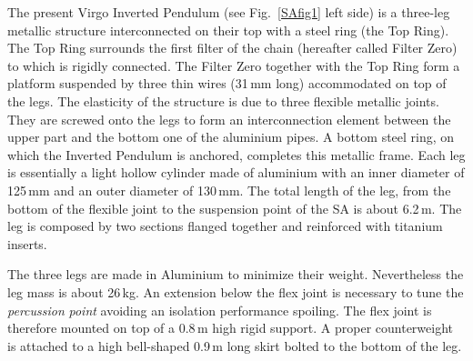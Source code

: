 The present Virgo Inverted Pendulum (see Fig.~\ref{SAfig1} left side) is a three-leg metallic structure interconnected on their top with a steel ring (the Top Ring). The Top Ring surrounds the first filter of the chain (hereafter called Filter Zero) to which is rigidly connected. The Filter Zero together with the Top Ring form a platform suspended by three thin wires (31\,mm long) accommodated on top of the legs. The elasticity of the structure is due to three flexible metallic joints. They are screwed onto the legs to form an interconnection element between the upper part and the bottom one of the aluminium pipes. A bottom steel ring, on which the Inverted Pendulum is anchored, completes this metallic frame. 
Each leg is essentially a light hollow cylinder made of aluminium with an inner diameter of 125\,mm and an outer diameter of 130\,mm. The total length of the leg, from the bottom of the flexible joint to the suspension point of the SA is about 6.2\,m. The leg is composed by two sections flanged together and reinforced with titanium inserts. 

The three legs are made in Aluminium to minimize their weight. Nevertheless the leg mass is about 26\,kg. An extension below the flex joint is necessary to tune the \emph{percussion} \emph{point} avoiding an isolation performance spoiling. The flex joint is therefore mounted on top of a 0.8\,m high rigid support. A proper counterweight is attached to a high bell-shaped 0.9\,m long skirt bolted to the bottom of the leg.

